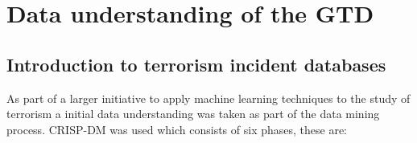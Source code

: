 \chapter[A Preliminary understanding of the global terrorism database]{Data understanding of the GTD}
\label{sec:appendixprelim}

\section{Introduction to terrorism incident databases}
As part of a larger initiative to apply machine learning techniques to the study of terrorism a initial data understanding was taken as part of the data mining process.  CRISP-DM \citep{chapman2000crisp} was used which consists of six phases, these are:

